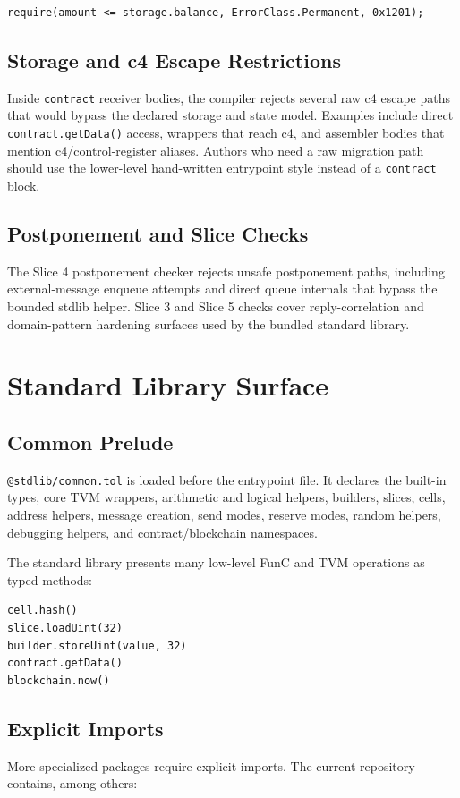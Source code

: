 \documentclass[12pt,oneside]{article}
\begin{document}
\begin{verbatim}
require(amount <= storage.balance, ErrorClass.Permanent, 0x1201);
\end{verbatim}

\subsection{Storage and c4 Escape Restrictions}
Inside \verb|contract| receiver bodies, the compiler rejects several raw c4
escape paths that would bypass the declared storage and state model. Examples
include direct \verb|contract.getData()| access, wrappers that reach c4, and
assembler bodies that mention c4/control-register aliases. Authors who need a
raw migration path should use the lower-level hand-written entrypoint style
instead of a \verb|contract| block.

\subsection{Postponement and Slice Checks}
The Slice 4 postponement checker rejects unsafe postponement paths, including
external-message enqueue attempts and direct queue internals that bypass the
bounded stdlib helper. Slice 3 and Slice 5 checks cover reply-correlation and
domain-pattern hardening surfaces used by the bundled standard library.

\section{Standard Library Surface}
\label{sec:stdlib}
\subsection{Common Prelude}
\verb|@stdlib/common.tol| is loaded before the entrypoint file. It declares
the built-in types, core TVM wrappers, arithmetic and logical helpers,
builders, slices, cells, address helpers, message creation, send modes, reserve
modes, random helpers, debugging helpers, and contract/blockchain namespaces.

The standard library presents many low-level FunC and TVM operations as typed
methods:

\begin{verbatim}
cell.hash()
slice.loadUint(32)
builder.storeUint(value, 32)
contract.getData()
blockchain.now()
\end{verbatim}

\subsection{Explicit Imports}
More specialized packages require explicit imports. The current repository
contains, among others:
\end{document}
